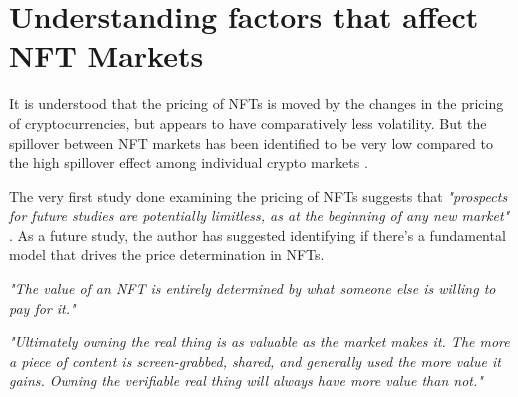 \documentclass[a4paper, 12pt, oneside]{report}
\begin{document}
\section{Understanding factors that affect NFT Markets}
It is understood that the pricing of NFTs is moved by the changes in the pricing of cryptocurrencies, but appears to have comparatively less volatility. But the spillover between NFT markets has been identified to be very low compared to the high spillover effect among individual crypto markets \autocite{dowling_is_2021}.

The very first study done examining the pricing of NFTs suggests that \emph{"prospects for future studies are potentially limitless, as at the beginning of any new market"} \autocite{dowling_fertile_2021}. As a future study, the author has suggested identifying if there's a fundamental model that drives the price determination in NFTs.





\emph{"The value of an NFT is entirely determined by what someone else is willing to pay for it."} \autocite{conti_what_2021}

\emph{"Ultimately owning the real thing is as valuable as the market makes it. The more a piece of content is screen-grabbed, shared, and generally used the more value it gains. Owning the verifiable real thing will always have more value than not."} \autocite{noauthor_erc-721_nodate}
\end{document}
